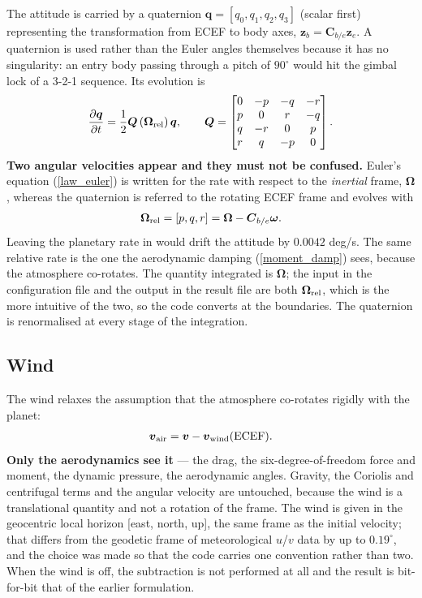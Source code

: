 \documentclass[11pt,a4paper]{article}
\newcommand{\bv}{{\boldsymbol v}}
\newcommand{\bq}{{\boldsymbol q}}
\newcommand{\bOm}{{\boldsymbol \Omega}}
\newcommand{\bom}{{\boldsymbol \omega}}
\newcommand{\bC}{{\boldsymbol C}}
\begin{document}
The attitude is carried by a quaternion $\bq = [q_0, q_1, q_2, q_3]$ (scalar first)
representing the transformation from ECEF to body axes,
${\boldsymbol z}_b = \bC_{b/e} {\boldsymbol z}_e$. A quaternion is used rather than the
Euler angles themselves because it has no singularity: an entry body passing through a
pitch of $90^\circ$ would hit the gimbal lock of a 3-2-1 sequence. Its evolution is
%
\begin{align}
	\frac{ \partial \bq }{ \partial t } = \frac{1}{2} {\boldsymbol Q} \left( \bOm_{\rm rel} \right) \bq ,
	\qquad
	{\boldsymbol Q} = \begin{bmatrix}
	0 & -p & -q & -r \\
	p & 0 & r & -q \\
	q & -r & 0 & p \\
	r & q & -p & 0 \end{bmatrix} .
\end{align}
%
\textbf{Two angular velocities appear and they must not be confused.} Euler's equation
(\ref{law_euler}) is written for the rate with respect to the \emph{inertial} frame,
$\bOm$, whereas the quaternion is referred to the rotating ECEF frame and evolves with
%
\begin{align}
	\bOm_{\rm rel} = \left[ p, q, r \right] = \bOm - \bC_{b/e} \bom .
\end{align}
%
Leaving the planetary rate in would drift the attitude by $0.0042$ deg/s. The same
relative rate is the one the aerodynamic damping (\ref{moment_damp}) sees, because the
atmosphere co-rotates. The quantity integrated is $\bOm$; the input in the configuration
file and the output in the result file are both $\bOm_{\rm rel}$, which is the more
intuitive of the two, so the code converts at the boundaries. The quaternion is
renormalised at every stage of the integration.

\subsection{Wind}

The wind relaxes the assumption that the atmosphere co-rotates rigidly with the planet:
%
\begin{align}
	\bv_{\rm air} = \bv - \bv_{\rm wind} ({\rm ECEF}) .
\end{align}
%
\textbf{Only the aerodynamics see it} --- the drag, the six-degree-of-freedom force and
moment, the dynamic pressure, the aerodynamic angles. Gravity, the Coriolis and
centrifugal terms and the angular velocity are untouched, because the wind is a
translational quantity and not a rotation of the frame. The wind is given in the
geocentric local horizon [east, north, up], the same frame as the initial velocity; that
differs from the geodetic frame of meteorological $u$/$v$ data by up to $0.19^\circ$, and
the choice was made so that the code carries one convention rather than two. When the
wind is off, the subtraction is not performed at all and the result is bit-for-bit that of
the earlier formulation.
\end{document}

